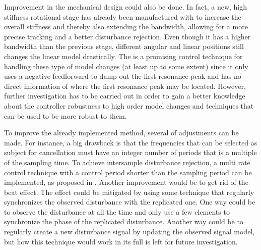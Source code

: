 Improvement in the mechanical design could also be done. In fact, a new, high stiffness rotational stage has already been manufactured with to increase the overall stiffness and thereby also extending the bandwidth, allowing for a more precise tracking and a better disturbance rejection. Even though it has a higher bandwidth than the previous stage, different angular and linear positions still changes the linear model drastically. The \abbrIRC is a promising control technique for handling these type of model changes (at least up to some extent) since it only uses a negative feedforward to damp out the first resonance peak and has no direct information of where the first resonance peak may be located. However, further investigation has to be carried out in order to gain a better knowledge about the controller robustness to high order model changes and techniques that can be used to be more robust to them.

To improve the already implemented \abbrRFDC method, several of adjustments can be made. For instance, a big drawback is that the frequencies that can be selected as subject for cancellation must have an integer number of periods that is a multiple of the sampling time. To achieve intersample disturbance rejection, a multi rate control technique with a control period shorter than the sampling period can be implemented, as proposed in \citep{fujimoto2009rro}. Another improvement would be to get rid of the beat effect. The effect could be mitigated by using some technique that regularly synchronizes the observed disturbance with the replicated one. One way could be to observe the disturbance at all the time and only use a few elements to synchronize the phase of the replicated disturbance. Another way could be to regularly create a new disturbance signal by updating the observed signal model, but how this technique would work in its full is left for future investigation.
